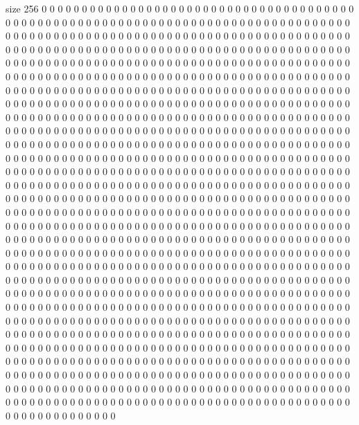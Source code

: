 size 256
0 0 0 0 0 0 0 0 0 0 0 0 0 0 0 0 0 0 0 0
0 0 0 0 0 0 0 0 0 0 0 0 0 0 0 0 0 0 0 0
0 0 0 0 0 0 0 0 0 0 0 0 0 0 0 0 0 0 0 0
0 0 0 0 0 0 0 0 0 0 0 0 0 0 0 0 0 0 0 0
0 0 0 0 0 0 0 0 0 0 0 0 0 0 0 0 0 0 0 0
0 0 0 0 0 0 0 0 0 0 0 0 0 0 0 0 0 0 0 0
0 0 0 0 0 0 0 0 0 0 0 0 0 0 0 0 0 0 0 0
0 0 0 0 0 0 0 0 0 0 0 0 0 0 0 0 0 0 0 0
0 0 0 0 0 0 0 0 0 0 0 0 0 0 0 0 0 0 0 0
0 0 0 0 0 0 0 0 0 0 0 0 0 0 0 0 0 0 0 0
0 0 0 0 0 0 0 0 0 0 0 0 0 0 0 0 0 0 0 0
0 0 0 0 0 0 0 0 0 0 0 0 0 0 0 0 0 0 0 0
0 0 0 0 0 0 0 0 0 0 0 0 0 0 0 0 0 0 0 0
0 0 0 0 0 0 0 0 0 0 0 0 0 0 0 0 0 0 0 0
0 0 0 0 0 0 0 0 0 0 0 0 0 0 0 0 0 0 0 0
0 0 0 0 0 0 0 0 0 0 0 0 0 0 0 0 0 0 0 0
0 0 0 0 0 0 0 0 0 0 0 0 0 0 0 0 0 0 0 0
0 0 0 0 0 0 0 0 0 0 0 0 0 0 0 0 0 0 0 0
0 0 0 0 0 0 0 0 0 0 0 0 0 0 0 0 0 0 0 0
0 0 0 0 0 0 0 0 0 0 0 0 0 0 0 0 0 0 0 0
0 0 0 0 0 0 0 0 0 0 0 0 0 0 0 0 0 0 0 0
0 0 0 0 0 0 0 0 0 0 0 0 0 0 0 0 0 0 0 0
0 0 0 0 0 0 0 0 0 0 0 0 0 0 0 0 0 0 0 0
0 0 0 0 0 0 0 0 0 0 0 0 0 0 0 0 0 0 0 0
0 0 0 0 0 0 0 0 0 0 0 0 0 0 0 0 0 0 0 0
0 0 0 0 0 0 0 0 0 0 0 0 0 0 0 0 0 0 0 0
0 0 0 0 0 0 0 0 0 0 0 0 0 0 0 0 0 0 0 0
0 0 0 0 0 0 0 0 0 0 0 0 0 0 0 0 0 0 0 0
0 0 0 0 0 0 0 0 0 0 0 0 0 0 0 0 0 0 0 0
0 0 0 0 0 0 0 0 0 0 0 0 0 0 0 0 0 0 0 0
0 0 0 0 0 0 0 0 0 0 0 0 0 0 0 0 0 0 0 0
0 0 0 0 0 0 0 0 0 0 0 0 0 0 0 0 0 0 0 0
0 0 0 0 0 0 0 0 0 0 0 0 0 0 0 0 0 0 0 0
0 0 0 0 0 0 0 0 0 0 0 0 0 0 0 0 0 0 0 0
0 0 0 0 0 0 0 0 0 0 0 0 0 0 0 0 0 0 0 0
0 0 0 0 0 0 0 0 0 0 0 0 0 0 0 0 0 0 0 0
0 0 0 0 0 0 0 0 0 0 0 0 0 0 0 0 0 0 0 0
0 0 0 0 0 0 0 0 0 0 0 0 0 0 0 0 0 0 0 0
0 0 0 0 0 0 0 0 0 0 0 0 0 0 0 0 0 0 0 0
0 0 0 0 0 0 0 0 0 0 0 0 0 0 0 0 0 0 0 0
0 0 0 0 0 0 0 0 0 0 0 0 0 0 0 0 0 0 0 0
0 0 0 0 0 0 0 0 0 0 0 0 0 0 0 0 0 0 0 0
0 0 0 0 0 0 0 0 0 0 0 0 0 0 0 0 0 0 0 0
0 0 0 0 0 0 0 0 0 0 0 0 0 0 0 0 0 0 0 0
0 0 0 0 0 0 0 0 0 0 0 0 0 0 0 0 0 0 0 0
0 0 0 0 0 0 0 0 0 0 0 0 0 0 0 0 0 0 0 0
0 0 0 0 0 0 0 0 0 0 0 0 0 0 0 0 0 0 0 0
0 0 0 0 0 0 0 0 0 0 0 0 0 0 0 0 0 0 0 0
0 0 0 0 0 0 0 0 0 0 0 0 0 0 0 0 0 0 0 0
0 0 0 0 0 0 0 0 0 0 0 0 0 0 0 0 0 0 0 0
0 0 0 0 0 0 0 0 0 0 0 0 0 0 0 0 0 0 0 0
0 0 0 0 0 0 0 0 0 0 0 0 0 0 0 0 0 0 0 0
0 0 0 0 0 0 0 0 0 0 0 0 0 0 0 0 0 0 0 0
0 0 0 0 0 0 0 0 0 0 0 0 0 0 0 0 0 0 0 0
0 0 0 0 0 0 0 0 0 0 0 0 0 0 0 0 0 0 0 0
0 0 0 0 0 0 0 0 0 0 0 0 0 0 0 0 0 0 0 0
0 0 0 0 0 0 0 0 0 0 0 0 0 0 0 0 0 0 0 0
0 0 0 0 0 0 0 0 0 0 0 0 0 0 0 0 0 0 0 0
0 0 0 0 0 0 0 0 0 0 0 0 0 0 0 0 0 0 0 0
0 0 0 0 0 0 0 0 0 0 0 0 0 0 0 0 0 0 0 0
0 0 0 0 0 0 0 0 0 0 0 0 0 0 0 0 0 0 0 0
0 0 0 0 0 0 0 0 0 0 0 0 0 0 0 0 0 0 0 0
0 0 0 0 0 0 0 0 0 0 0 0 0 0 0 0 0 0 0 0
0 0 0 0 0 0 0 0 0 0 0 0 0 0 0 0 0 0 0 0
0 0 0 0 0 0 0 0 0 0 0 0 0 0 0 0 0 0 0 0
